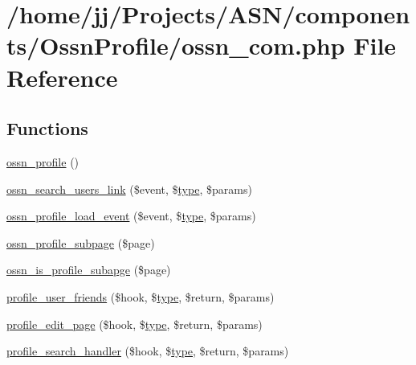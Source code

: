 \hypertarget{_ossn_profile_2ossn__com_8php}{}\section{/home/jj/\+Projects/\+A\+S\+N/components/\+Ossn\+Profile/ossn\+\_\+com.php File Reference}
\label{_ossn_profile_2ossn__com_8php}
\subsection*{Functions}
\begin{DoxyCompactItemize}
\item 
\hyperlink{_ossn_profile_2ossn__com_8php_a4999492fa3baf219013e48b70075defa}{ossn\+\_\+profile} ()
\item 
\hyperlink{_ossn_profile_2ossn__com_8php_afa031818b95b8d4234ac6280350d5f97}{ossn\+\_\+search\+\_\+users\+\_\+link} (\$event, \$\hyperlink{_ossn_wall_2actions_2wall_2post_2group_8php_a2dc1bb4e1ed0029daa81ac0776b14b51}{type}, \$params)
\item 
\hyperlink{_ossn_profile_2ossn__com_8php_a8b70c5fa6ef75b3736646c88774b4dba}{ossn\+\_\+profile\+\_\+load\+\_\+event} (\$event, \$\hyperlink{_ossn_wall_2actions_2wall_2post_2group_8php_a2dc1bb4e1ed0029daa81ac0776b14b51}{type}, \$params)
\item 
\hyperlink{_ossn_profile_2ossn__com_8php_aaf443efbdb89c32a03f40e73b9d15b69}{ossn\+\_\+profile\+\_\+subpage} (\$page)
\item 
\hyperlink{_ossn_profile_2ossn__com_8php_a1ebfde2ed687aea36a550c2afd05706a}{ossn\+\_\+is\+\_\+profile\+\_\+subapge} (\$page)
\item 
\hyperlink{_ossn_profile_2ossn__com_8php_ac9a25e605f108418ac0325be7f98eebd}{profile\+\_\+user\+\_\+friends} (\$hook, \$\hyperlink{_ossn_wall_2actions_2wall_2post_2group_8php_a2dc1bb4e1ed0029daa81ac0776b14b51}{type}, \$return, \$params)
\item 
\hyperlink{_ossn_profile_2ossn__com_8php_ad959bcabf0da486657a8a28b8922e04c}{profile\+\_\+edit\+\_\+page} (\$hook, \$\hyperlink{_ossn_wall_2actions_2wall_2post_2group_8php_a2dc1bb4e1ed0029daa81ac0776b14b51}{type}, \$return, \$params)
\item 
\hyperlink{_ossn_profile_2ossn__com_8php_a67cbdb693a1b0fc22fc6b582d8bdaa43}{profile\+\_\+search\+\_\+handler} (\$hook, \$\hyperlink{_ossn_wall_2actions_2wall_2post_2group_8php_a2dc1bb4e1ed0029daa81ac0776b14b51}{type}, \$return, \$params)

\end{DoxyCompactItemize}
